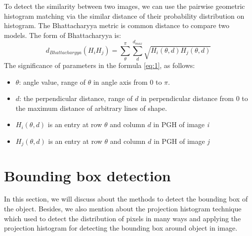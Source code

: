 To detect the similarity between two images, we can use the pairwise geometric histogram matching via the similar distance of their probability distribution on histogram. The Bhattacharyya metric is common distance to compare two models. The form of Bhattacharyya is:
\begin{equation}
	\label{eq:1}
d_{Bhattacharyya} (H_{i}H_{j}) = \sum\limits_{\theta}^{\pi}\sum\limits_{d}^{d_{max}}\sqrt{H_{i}(\theta,d)H_{j}(\theta,d)}
\end{equation}
The significance of parameters in the formula \ref{eq:1}, as follows:
\begin{itemize}
\item $\theta$: angle value, range of $\theta$ in angle axis from 0 to $\pi$.
\item $d$: the perpendicular distance, range of $d$ in perpendicular distance from 0 to the maximum distance of arbitrary lines of shape.
\item $H_{i}(\theta,d)$ is an entry at row $\theta$ and column $d$ in PGH of image \textit{i}
\item $H_{j}(\theta,d)$ is an entry at row $\theta$ and column $d$ in PGH of image \textit{j}
\end{itemize}
\section{Bounding box detection}
In this section, we will discuss about the methods to detect the bounding box of the object. Besides, we also mention about the projection histogram technique which used to detect the distribution of pixels in many ways and applying the projection histogram for detecting the bounding box around object in image.
